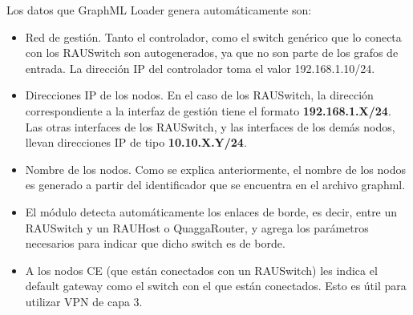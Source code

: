Los datos que GraphML Loader genera automáticamente son:
\begin{itemize}
	\item Red de gestión. Tanto el controlador, como el switch genérico que lo conecta con los RAUSwitch son autogenerados, ya que no son parte de los grafos de entrada. La dirección IP del controlador toma el valor 192.168.1.10/24.
	\item Direcciones IP de los nodos. En el caso de los RAUSwitch, la dirección correspondiente a la interfaz de gestión tiene el formato \textbf{192.168.1.X/24}. Las otras interfaces de los RAUSwitch, y las interfaces de los demás nodos, llevan direcciones IP de tipo \textbf{10.10.X.Y/24}.
	\item Nombre de los nodos. Como se explica anteriormente, el nombre de los nodos es generado a partir del identificador que se encuentra en el archivo graphml.
	\item El módulo detecta automáticamente los enlaces de borde, es decir, entre un RAUSwitch y un RAUHost o QuaggaRouter, y agrega los parámetros necesarios para indicar que dicho switch es de borde.
	\item A los nodos CE (que están conectados con un RAUSwitch) les indica el default gateway como el switch con el que están conectados. Esto es útil para utilizar VPN de capa 3.
\end{itemize}

